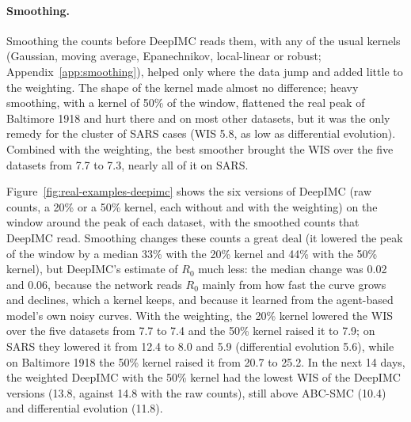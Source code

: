 \documentclass[12pt]{article}
\begin{document}
\begin{table}[htbp]
\centering
\caption{Fit check: percentage of windows that no draw of DeepIMC reproduces within twice the Poisson noise
($d_{\min} > 1$, Section~\ref{sec:weighting}), and DeepIMC's WIS divided by that of differential evolution (median
over the windows) for the windows that are reproduced and those that are not.}
\label{tab:fit-check}
\small

\end{table}

\paragraph{Smoothing.} Smoothing the counts before DeepIMC reads them, with any of the usual kernels (Gaussian,
moving average, Epanechnikov, local-linear or robust; Appendix~\ref{app:smoothing}), helped only where the data jump
and added little to the weighting. The shape of the kernel made almost no difference; heavy smoothing, with a kernel
of 50\% of the window, flattened the real peak of Baltimore 1918 and hurt there and on most other datasets, but it
was the only remedy for the cluster of SARS cases (WIS 5.8, as low as differential evolution). Combined with the
weighting, the best smoother brought the WIS over the five datasets from 7.7 to 7.3, nearly all of it on SARS.

Figure~\ref{fig:real-examples-deepimc} shows the six versions of DeepIMC (raw counts, a 20\% or a 50\% kernel, each
without and with the weighting) on the window around the peak of each dataset, with the smoothed counts that DeepIMC
read. Smoothing changes these counts a great deal (it lowered the peak of the window by a median 33\% with the 20\%
kernel and 44\% with the 50\% kernel), but DeepIMC's estimate of $R_0$ much less: the median change was 0.02 and
0.06, because the network reads $R_0$ mainly from how fast the curve grows and declines, which a kernel keeps, and
because it learned from the agent-based model's own noisy curves. With the weighting, the 20\% kernel lowered the WIS
over the five datasets from 7.7 to 7.4 and the 50\% kernel raised it to 7.9; on SARS they lowered it from 12.4 to 8.0
and 5.9 (differential evolution 5.6), while on Baltimore 1918 the 50\% kernel raised it from 20.7 to 25.2. In the next
14 days, the weighted DeepIMC with the 50\% kernel had the lowest WIS of the DeepIMC versions (13.8, against 14.8 with
the raw counts), still above ABC-SMC (10.4) and differential evolution (11.8).
\end{document}
